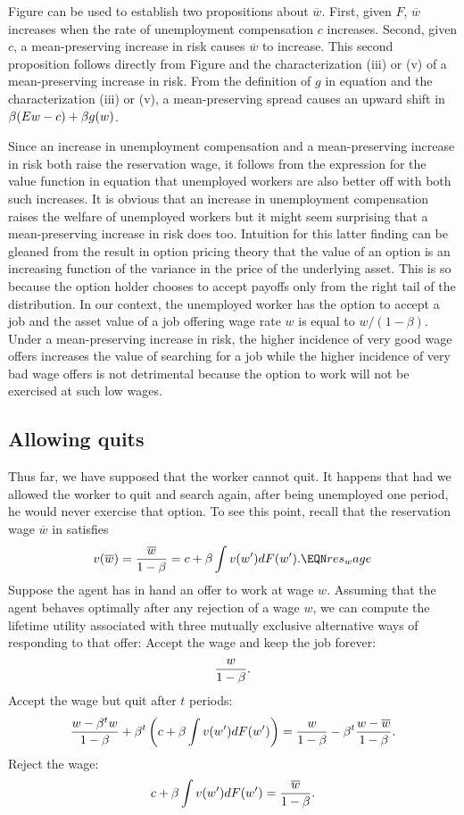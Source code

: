 Figure  %
can be used to establish two propositions about
$\overline w$.  First, given $F$, $\overline w$ increases when the rate
of unemployment compensation $c$ increases.  Second, given $c$,
a mean-preserving increase in risk causes $\overline w$ to increase.
This second proposition follows directly from Figure  %
and the
characterization (iii) or (v) of a mean-preserving increase in risk.
From the definition of $g$ in equation  and the
characterization (iii) or (v), a mean-preserving spread
causes an upward shift in ${\beta}(Ew-c)+{\beta} g(w)$.

Since  an increase in unemployment compensation and a mean-preserving
increase in risk both raise the reservation wage, it follows from the expression
for the value function in equation  that unemployed workers are
also better off with both such increases. It is obvious that an increase
in unemployment compensation raises the welfare of unemployed workers but
it might seem surprising that  a mean-preserving increase in risk does too.
Intuition for this latter finding can be gleaned from the result in option
pricing theory that the value of an option is an increasing function of
the variance in the price of the underlying asset. This is so because
the option holder chooses to accept  payoffs only from the right tail of
the distribution. In our context, the unemployed worker has the option
to accept a job and the asset value of a job offering wage rate $w$ is
equal to $w/(1-\beta)$.
Under a mean-preserving increase in risk, the higher incidence of very
good wage offers increases the value of searching for a job while
the higher incidence of very bad wage offers is not detrimental because
the option to work will  not be exercised at such low
wages.

\subsection{Allowing quits}\label{quits}%
 Thus far, we have supposed that the worker cannot quit.
It happens that had we allowed the worker to
quit and search again, after being unemployed one period,
he would never exercise that option.  To see this point,
recall that the reservation wage $\overline w$ in  satisfies
 $$
 v(\overline w) = {\overline w \over 1-\beta}= c+\beta \int v(w')dF(w'). \EQN res_wage
 $$
 Suppose the agent has in hand an offer to work at wage $w$.
 Assuming that
 the agent behaves optimally after any rejection of a wage $w$,
we can
 compute the lifetime utility associated with
three mutually exclusive alternative ways of responding to that offer:
\medskip
  Accept the wage and keep the job forever:
 $$
 {w \over 1-\beta}.
 $$
  Accept the wage but quit after $t$ periods:
 $$
 {w -\beta^t w \over 1 - \beta} +
 \beta^t \left(c+\beta \int v(w')dF(w')\right)
 = {w \over 1 - \beta} - \beta^t {w -\overline w \over 1 - \beta}.
 $$
  Reject the wage:
 $$
 c+\beta \int v(w')dF(w') = {\overline w \over 1-\beta}.
 $$

